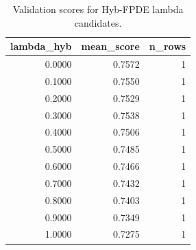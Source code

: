 \begin{table}[t]
\caption{Validation scores for Hyb-FPDE lambda candidates.}
\label{tab:lambda_distribution_computed}
\centering
\begin{tabular}{rrr}
\toprule
lambda\_hyb & mean\_score & n\_rows \\
\midrule
0.0000 & 0.7572 & 1 \\
0.1000 & 0.7550 & 1 \\
0.2000 & 0.7529 & 1 \\
0.3000 & 0.7538 & 1 \\
0.4000 & 0.7506 & 1 \\
0.5000 & 0.7485 & 1 \\
0.6000 & 0.7466 & 1 \\
0.7000 & 0.7432 & 1 \\
0.8000 & 0.7403 & 1 \\
0.9000 & 0.7349 & 1 \\
1.0000 & 0.7275 & 1 \\
\bottomrule
\end{tabular}

\end{table}
